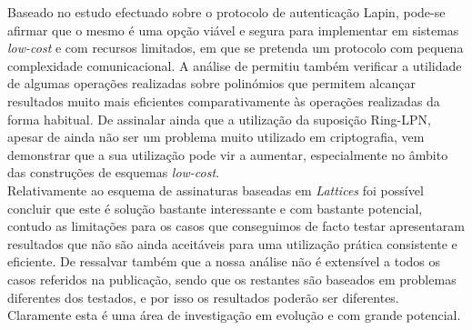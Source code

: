 Baseado no estudo efectuado sobre o protocolo de autenticação Lapin, pode-se afirmar que o mesmo é uma opção viável e segura para implementar em sistemas \textit{low-cost} e com recursos limitados, em que se pretenda um protocolo com pequena complexidade comunicacional. A análise de \cite{lapin} permitiu também verificar a utilidade de algumas operações realizadas sobre polinómios que permitem alcançar resultados muito mais eficientes comparativamente às operações realizadas da forma habitual. De assinalar ainda que a utilização da suposição \textsf{Ring-LPN}, apesar de ainda não ser um problema muito utilizado em criptografia, vem demonstrar que a sua utilização pode vir a aumentar, especialmente no âmbito das construções de esquemas \textit{low-cost}.\\
Relativamente ao esquema de assinaturas baseadas em \textit{Lattices} foi possível concluir que este é solução bastante interessante e com bastante potencial, contudo as limitações para os casos que conseguimos de facto testar apresentaram resultados que não são ainda aceitáveis para uma utilização prática consistente e eficiente. De ressalvar também que a nossa análise não é extensível a todos os casos referidos na publicação, sendo que os restantes são baseados em problemas diferentes dos testados, e por isso os resultados poderão ser diferentes. Claramente esta é uma área de investigação em evolução e com grande potencial.
